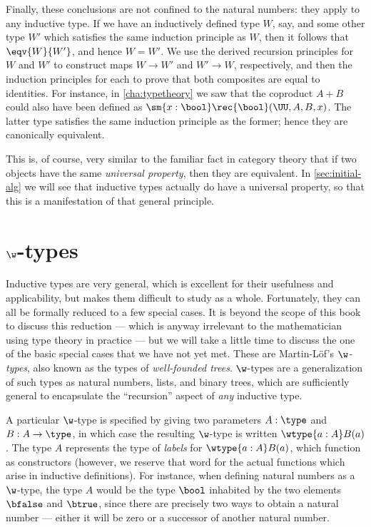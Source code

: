 Finally, these conclusions are not confined to the natural numbers: they apply to any inductive type.
If we have an inductively defined type $W$, say, and some other type $W'$ which satisfies the same induction principle as $W$, then it follows that $\eqv{W}{W'}$, and hence $W=W'$.
We use the derived recursion principles for $W$ and $W'$ to construct maps $W\to W'$ and $W'\to W$, respectively, and then the induction principles for each to prove that both composites are equal to identities.
For instance, in \autoref{cha:typetheory} we saw that the coproduct $A+B$ could also have been defined as $\sm{x:\bool} \rec{\bool}(\UU,A,B,x)$.
The latter type satisfies the same induction principle as the former; hence they are canonically equivalent.

This is, of course, very similar to the familiar fact in category theory that if two objects have the same \emph{universal property}, then they are equivalent.
In \autoref{sec:initial-alg} we will see that inductive types actually do have a universal property, so that this is a manifestation of that general principle.


\section{$\w$-types}
\label{sec:w-types}

Inductive types are very general, which is excellent for their usefulness and applicability, but makes them difficult to study as a whole.
Fortunately, they can all be formally reduced to a few special cases.
It is beyond the scope of this book to discuss this reduction --- which is anyway irrelevant to the mathematician using type theory in practice --- but we will take a little time to discuss the one of the basic special cases that we have not yet met.
These are Martin-L{\"o}f's \emph{$\w$-types}, also known as the types of \emph{well-founded trees}.
%
$\w$-types are a generalization of such types as natural numbers, lists, and binary trees, which are sufficiently general to encapsulate the ``recursion'' aspect of \emph{any} inductive type.

A particular $\w$-type is specified by giving two parameters $A : \type$ and $B : A \to \type$, in which case the resulting $\w$-type is written $\wtype{a:A} B(a)$.
The type $A$ represents the type of \emph{labels} for $\wtype{a :A} B(a)$, which function as constructors (however, we reserve that word for the actual functions which arise in inductive definitions). For instance, when defining natural numbers as a $\w$-type,%
the type $A$ would be the type $\bool$ inhabited by the two elements $\bfalse$ and $\btrue$, since there are precisely two ways to obtain a natural number --- either it will be zero or a successor of another natural number.

